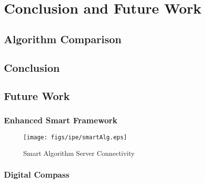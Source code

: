 \chapter{Conclusion and Future Work}
\label{ch: Chapter6}

\section{Algorithm Comparison}

\section{Conclusion}

\section{Future Work}
\subsection{Enhanced Smart Framework}
\begin{figure}[!htbp]
    \centering
    \texttt{[image: figs/ipe/smartAlg.eps]}
    \label{fig:Smart_Alg}
    \caption{Smart Algorithm Server Connectivity}
\end{figure}

\subsection{Digital Compass}

